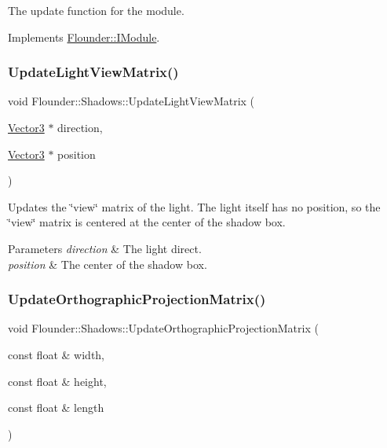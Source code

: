 The update function for the module. 



Implements \hyperlink{class_flounder_1_1_i_module_a1812bb03a6990e4698a10c043fa25fde}{Flounder\+::\+I\+Module}.

\mbox{\label{class_flounder_1_1_shadows_ac9ec359e3f78dcfdcbfb09e244b89054}} 
\subsubsection{\texorpdfstring{Update\+Light\+View\+Matrix()}{UpdateLightViewMatrix()}}
{\footnotesize\ttfamily void Flounder\+::\+Shadows\+::\+Update\+Light\+View\+Matrix (\begin{DoxyParamCaption}\item[{\hyperlink{class_flounder_1_1_vector3}{Vector3} $\ast$}]{direction,  }\item[{\hyperlink{class_flounder_1_1_vector3}{Vector3} $\ast$}]{position }\end{DoxyParamCaption})\hspace{0.3cm}{\ttfamily [private]}}



Updates the \char`\"{}view\char`\"{} matrix of the light. The light itself has no position, so the \char`\"{}view\char`\"{} matrix is centered at the center of the shadow box. 


\begin{DoxyParams}{Parameters}
{\em direction} & The light direct. \\
\hline
{\em position} & The center of the shadow box. \\
\hline
\end{DoxyParams}
\mbox{\label{class_flounder_1_1_shadows_a2dc9f096db529ae923d5ca392c4d43a7}} 
\subsubsection{\texorpdfstring{Update\+Orthographic\+Projection\+Matrix()}{UpdateOrthographicProjectionMatrix()}}
{\footnotesize\ttfamily void Flounder\+::\+Shadows\+::\+Update\+Orthographic\+Projection\+Matrix (\begin{DoxyParamCaption}\item[{const float \&}]{width,  }\item[{const float \&}]{height,  }\item[{const float \&}]{length }\end{DoxyParamCaption})\hspace{0.3cm}{\ttfamily [private]}}



